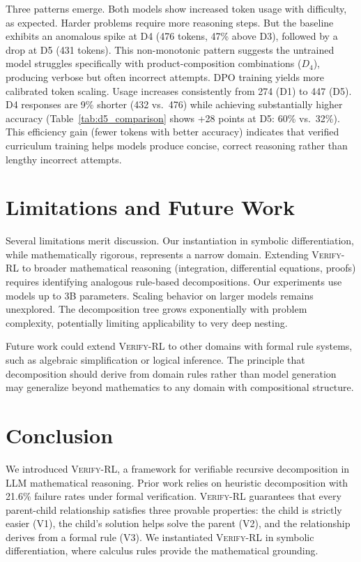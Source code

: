 \documentclass[a4paper,fleqn]{cas-dc}
\theoremstyle{definition}
\begin{document}
Three patterns emerge. Both models show increased token usage with difficulty, as expected. Harder problems require more reasoning steps. But the baseline exhibits an anomalous spike at D4 (476 tokens, 47\% above D3), followed by a drop at D5 (431 tokens). This non-monotonic pattern suggests the untrained model struggles specifically with product-composition combinations ($D_4$), producing verbose but often incorrect attempts. DPO training yields more calibrated token scaling. Usage increases consistently from 274 (D1) to 447 (D5). D4 responses are 9\% shorter (432 vs.\ 476) while achieving substantially higher accuracy (Table~\ref{tab:d5_comparison} shows +28 points at D5: 60\% vs.\ 32\%). This efficiency gain (fewer tokens with better accuracy) indicates that verified curriculum training helps models produce concise, correct reasoning rather than lengthy incorrect attempts.

\section{Limitations and Future Work}

Several limitations merit discussion. Our instantiation in symbolic differentiation, while mathematically rigorous, represents a narrow domain. Extending \textsc{Verify-RL} to broader mathematical reasoning (integration, differential equations, proofs) requires identifying analogous rule-based decompositions. Our experiments use models up to 3B parameters. Scaling behavior on larger models remains unexplored. The decomposition tree grows exponentially with problem complexity, potentially limiting applicability to very deep nesting.

Future work could extend \textsc{Verify-RL} to other domains with formal rule systems, such as algebraic simplification or logical inference. The principle that decomposition should derive from domain rules rather than model generation may generalize beyond mathematics to any domain with compositional structure.

\section{Conclusion}
\label{sec:conclusion}
We introduced \textsc{Verify-RL}, a framework for verifiable recursive decomposition in LLM mathematical reasoning. Prior work relies on heuristic decomposition with 21.6\% failure rates under formal verification. \textsc{Verify-RL} guarantees that every parent-child relationship satisfies three provable properties: the child is strictly easier (V1), the child's solution helps solve the parent (V2), and the relationship derives from a formal rule (V3). We instantiated \textsc{Verify-RL} in symbolic differentiation, where calculus rules provide the mathematical grounding.
\end{document}
